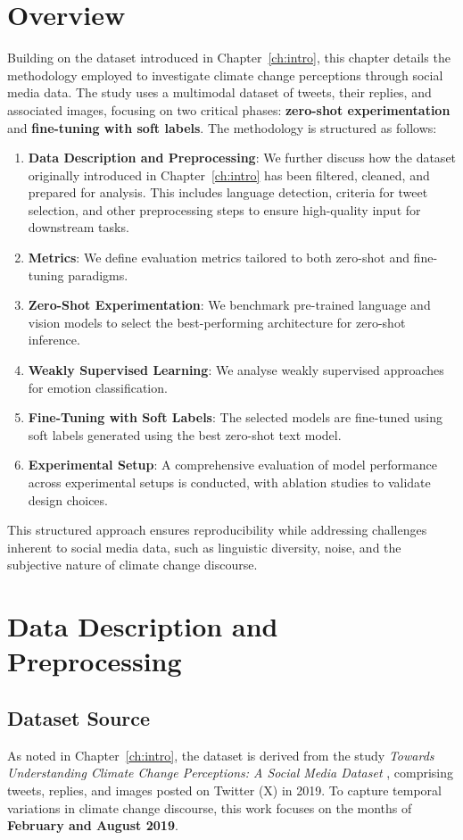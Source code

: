 \section{Overview}
Building on the dataset introduced in Chapter~\ref{ch:intro}, this chapter details the methodology employed to investigate climate change perceptions through social media data. The study uses a multimodal dataset of tweets, their replies, and associated images, focusing on two critical phases: \textbf{zero-shot experimentation} and \textbf{fine-tuning with soft labels}. The methodology is structured as follows:

\begin{enumerate}
    \item \textbf{Data Description and Preprocessing}: We further discuss how the dataset originally introduced in Chapter~\ref{ch:intro} has been filtered, cleaned, and prepared for analysis. This includes language detection, criteria for tweet selection, and other preprocessing steps to ensure high-quality input for downstream tasks.
    \item \textbf{Metrics}: We define evaluation metrics tailored to both zero-shot and fine-tuning paradigms.
    \item \textbf{Zero-Shot Experimentation}: We benchmark pre-trained language and vision models to select the best-performing architecture for zero-shot inference.
    \item \textbf{Weakly Supervised Learning}: We analyse weakly supervised approaches for emotion classification.
    \item \textbf{Fine-Tuning with Soft Labels}: The selected models are fine-tuned using soft labels generated using the best zero-shot text model.
    \item \textbf{Experimental Setup}: A comprehensive evaluation of model performance across experimental setups is conducted, with ablation studies to validate design choices.
\end{enumerate}

This structured approach ensures reproducibility while addressing challenges inherent to social media data, such as linguistic diversity, noise, and the subjective nature of climate change discourse.

\section{Data Description and Preprocessing}

\subsection{Dataset Source}
As noted in Chapter~\ref{ch:intro}, the dataset is derived from the study \emph{Towards Understanding Climate Change Perceptions: A Social Media Dataset} \cite{prasse2023towards}, comprising tweets, replies, and images posted on Twitter (X) in 2019. To capture temporal variations in climate change discourse, this work focuses on the months of \textbf{February and August 2019}.

